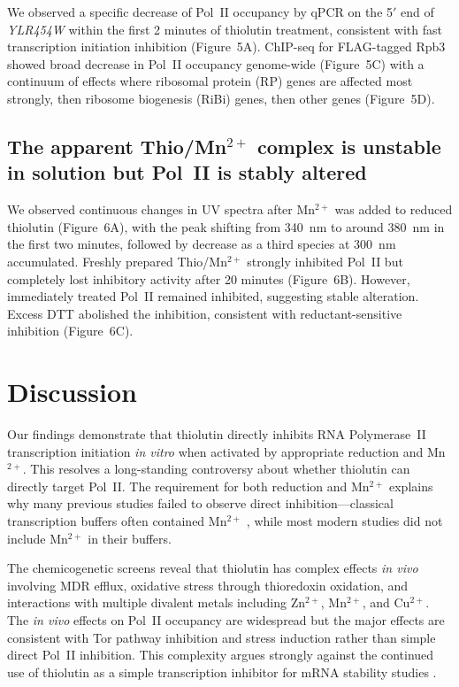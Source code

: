 \documentclass[11pt]{article}
\begin{document}
We observed a specific decrease of Pol~II occupancy by qPCR on the 5$'$ end of \textit{YLR454W} within the first 2 minutes of thiolutin treatment, consistent with fast transcription initiation inhibition (Figure~5A). ChIP-seq for FLAG-tagged Rpb3 showed broad decrease in Pol~II occupancy genome-wide (Figure~5C) with a continuum of effects where ribosomal protein (RP) genes are affected most strongly, then ribosome biogenesis (RiBi) genes, then other genes (Figure~5D).

\subsection{The apparent Thio/Mn$^{2+}$ complex is unstable in solution but Pol~II is stably altered}

We observed continuous changes in UV spectra after Mn$^{2+}$ was added to reduced thiolutin (Figure~6A), with the peak shifting from 340~nm to around 380~nm in the first two minutes, followed by decrease as a third species at 300~nm accumulated. Freshly prepared Thio/Mn$^{2+}$ strongly inhibited Pol~II but completely lost inhibitory activity after 20 minutes (Figure~6B). However, immediately treated Pol~II remained inhibited, suggesting stable alteration. Excess DTT abolished the inhibition, consistent with reductant-sensitive inhibition (Figure~6C).

\section{Discussion}

Our findings demonstrate that thiolutin directly inhibits RNA Polymerase~II transcription initiation \textit{in vitro} when activated by appropriate reduction and Mn$^{2+}$. This resolves a long-standing controversy about whether thiolutin can directly target Pol~II. The requirement for both reduction and Mn$^{2+}$ explains why many previous studies failed to observe direct inhibition---classical transcription buffers often contained Mn$^{2+}$ \citep{jimenez1973}, while most modern studies did not include Mn$^{2+}$ in their buffers.

The chemicogenetic screens reveal that thiolutin has complex effects \textit{in vivo} involving MDR efflux, oxidative stress through thioredoxin oxidation, and interactions with multiple divalent metals including Zn$^{2+}$, Mn$^{2+}$, and Cu$^{2+}$. The \textit{in vivo} effects on Pol~II occupancy are widespread but the major effects are consistent with Tor pathway inhibition and stress induction rather than simple direct Pol~II inhibition. This complexity argues strongly against the continued use of thiolutin as a simple transcription inhibitor for mRNA stability studies \citep{grigull2004,millan2006,pelechano2008}.
\end{document}
